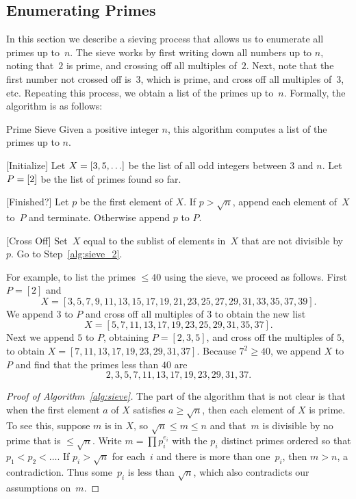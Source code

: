 \subsection{Enumerating Primes}\label{sec:enum_primes}
In this section we describe a sieving process that allows us to
enumerate all primes up to~$n$.  The sieve works by first writing down
all numbers up to $n$, noting that~$2$ is prime, and crossing off all
multiples of~$2$.  Next, note that the first number not crossed off
is~$3$, which is prime, and cross off all multiples of~$3$, etc.
Repeating this process, we obtain a list of the primes up to~$n$.
Formally, the algorithm is as follows:
\begin{algorithm}{Prime Sieve}\label{alg:sieve}
Given a positive integer $n$, this algorithm computes a list of the
primes up to $n$.
\begin{steps}
\item{}[Initialize] Let $X= [3,5,\ldots]$ be the list
of all odd integers between $3$ and $n$.  Let $P= [2]$ be the list
of primes found so far.
\item{}[Finished?]\label{alg:sieve_2}
Let $p$ be the first element of $X$.
If $p>\sqrt{n}$, append each element of~$X$
to~$P$ and terminate.   Otherwise append $p$ to $P$.
\item{}[Cross Off]
Set~$X$ equal to the sublist of elements in~$X$ that
are not divisible by~$p$.
Go to Step~\ref{alg:sieve_2}.
\end{steps}
\end{algorithm}
For example, to list the primes $\leq 40$ using the sieve, we
proceed as follows.  First $P=[2]$ and
$$X = [3,5,7,9,11,13,15,17,19,21,23,25,27,29,31,33,35,37,39].$$
We append $3$ to $P$ and cross off all multiples of $3$ to obtain
the new list
$$X = [5,7,11,13,17,19,23,25,29,31,35,37].$$
Next we append $5$ to $P$, obtaining $P=[2,3,5]$, and cross off
the multiples of $5$, to obtain $X = [7,11,13,17,19,23,29,31,37].$
Because $7^2\geq 40$, we append $X$ to $P$ and find that the
primes less than $40$ are
$$
  2,3,5, 7,11,13,17,19,23,29,31,37.
$$
\begin{proof}[Proof of Algorithm~\ref{alg:sieve}]
The part of the algorithm that is not clear is that
when the first element $a$ of $X$ satisfies $a\geq \sqrt{n}$,
then each element of $X$ is prime.
To see this, suppose $m$ is in $X$, so
$\sqrt{n} \leq m\leq n$ and that~$m$ is divisible by
no prime that is $\leq \sqrt{n}$.  Write $m=\prod p_i^{e_i}$ with
the $p_i$ distinct primes ordered so that $p_1<p_2<\ldots$.  If $p_i>\sqrt{n}$
for each~$i$ and there is more than one~$p_i$, then $m>n$,
a contradiction.  Thus some~$p_i$ is less than $\sqrt{n}$,
which also contradicts our assumptions on~$m$.
\end{proof}


